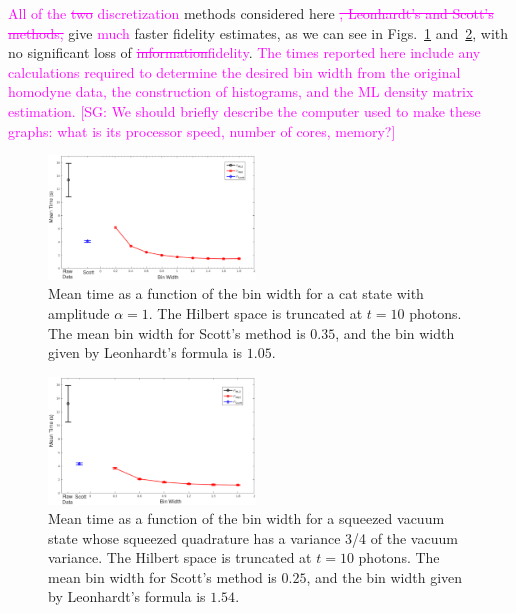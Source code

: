 \documentclass[
reprint,
superscriptaddress,
showpacs,
amsmath,
amssymb,
aps,
pra,
longbibliography
]{revtex4-1}
\providecommand{\aucmnt}[1]{#1}
\providecommand{\editcolor}[2]{\textcolor{#1}{#2}}
\providecommand{\aucmnt}[1]{}
\providecommand{\editcolor}[2]{#2}
\newcommand{\SG}[1]{\editcolor{magenta}{#1}}
\newcommand{\SGs}[1]{\aucmnt{\editcolor{magenta}{\sout{#1}}}}
\newcommand{\SGc}[1]{\aucmnt{\editcolor{magenta}{[SG: #1]}}}
\begin{document}
\SG{All of the} \SGs{two} \SG{discretization} methods considered here
\SGs{, Leonhardt's and Scott's methods,} give \SG{much} faster
fidelity estimates, as we can see in Figs.~\ref{fig-time-catstate}
and~\ref{fig-time-squeezed}, with no significant loss of
\SGs{information}\SG{fidelity}. \SG{The times reported here include
  any calculations required to determine the desired bin width from
  the original homodyne data, the construction of histograms, and the
  ML density matrix estimation.} \SGc{We should briefly describe the
  computer used to make these graphs: what is its processor speed,
  number of cores, memory?}

\begin{figure}
  \includegraphics[width=0.49\textwidth]{time-estadogato_alpha_1.eps}
  \caption{Mean time as a function of the bin width for a cat state
    with amplitude $\alpha = 1$. The Hilbert space is truncated at $t=10$
    photons. The mean bin width for Scott's method is $0.35$, and the
    bin width given by Leonhardt's formula is $1.05$.}
  \label{fig-time-catstate}
\end{figure}

\begin{figure}
  \includegraphics[width=0.49\textwidth]{time-vacuocomprimido.eps}
  \caption{Mean time as a function of the bin width for a squeezed
    vacuum state whose squeezed quadrature has a variance 3/4 of the
    vacuum variance. The Hilbert space is truncated at $t=10$ photons. The
    mean bin width for Scott's method is $0.25$, and the bin width
    given by Leonhardt's formula is $1.54$.}
  \label{fig-time-squeezed}
\end{figure}
\end{document}
